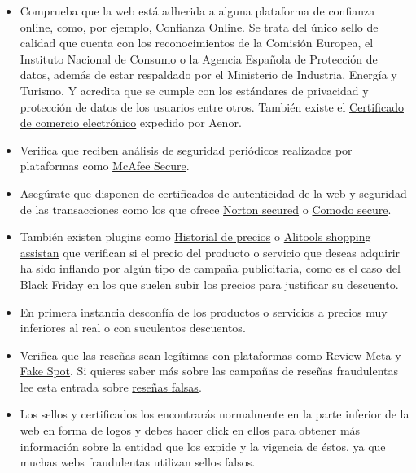 \documentclass[
  a4paper,
  openany]{book}
\begin{document}
\begin{itemize}
  \begin{itemize}
  \item
    Comprueba que la web está adherida a alguna plataforma de confianza online, como, por ejemplo, \href{https://www.confianzaonline.es/}{Confianza Online}. Se trata del único sello de calidad que cuenta con los reconocimientos de la Comisión Europea, el Instituto Nacional de Consumo o la Agencia Española de Protección de datos, además de estar respaldado por el Ministerio de Industria, Energía y Turismo. Y acredita que se cumple con los estándares de privacidad y protección de datos de los usuarios entre otros. También existe el \href{https://www.aenor.com/certificacion/tecnologias-de-la-informacion/buenas-practicas-comercio-electronico}{Certificado de comercio electrónico} expedido por Aenor.
  \item
    Verifica que reciben análisis de seguridad periódicos realizados por plataformas como \href{https://www.mcafeesecure.com/certification}{McAfee Secure}.
  \item
    Asegúrate que disponen de certificados de autenticidad de la web y seguridad de las transacciones como los que ofrece \href{https://es.norton.com/internet-security}{Norton secured} o \href{https://www.comodo.com/home/internet-security/secure-shopping.php}{Comodo secure}.
  \item
    También existen plugins como \href{https://chrome.google.com/webstore/detail/historial-de-precios/fdeopiliemdomncemeibjpmccgmnkfig?hl=es-419\&authuser=0}{Historial de precios} o \href{https://chrome.google.com/webstore/detail/alitools-shopping-assista/eenflijjbchafephdplkdmeenekabdfb?hl=es-419\&authuser=0}{Alitools shopping assistan} que verifican si el precio del producto o servicio que deseas adquirir ha sido inflando por algún tipo de campaña publicitaria, como es el caso del Black Friday en los que suelen subir los precios para justificar su descuento.
  \item
    En primera instancia desconfía de los productos o servicios a precios muy inferiores al real o con suculentos descuentos.
  \item
    Verifica que las reseñas sean legítimas con plataformas como \href{https://reviewmeta.com/}{Review Meta} y \href{https://www.fakespot.com/}{Fake Spot}. Si quieres saber más sobre las campañas de reseñas fraudulentas lee esta entrada sobre \href{https://www.genbeta.com/actualidad/asi-incentivaban-a-crear-resenas-falsas-proveedores-chinos-baneados-amazon}{reseñas falsas}.
  \item
    Los sellos y certificados los encontrarás normalmente en la parte inferior de la web en forma de logos y debes hacer click en ellos para obtener más información sobre la entidad que los expide y la vigencia de éstos, ya que muchas webs fraudulentas utilizan sellos falsos.
  \end{itemize}
\end{itemize}
\end{document}
